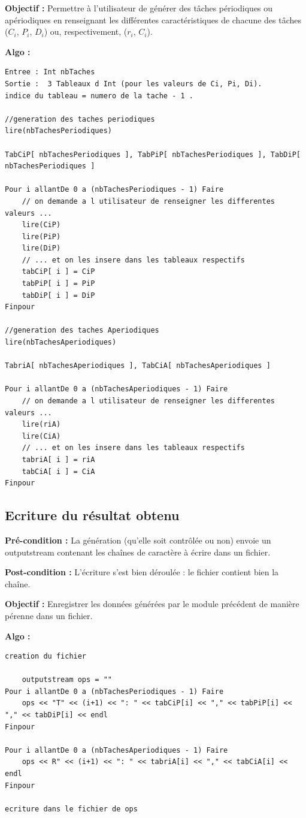 			\textbf{Objectif :} Permettre à l’utilisateur de générer des tâches périodiques ou apériodiques en renseignant les différentes caractéristiques de chacune des tâches ($C_i$, $P_i$, $D_i$) ou, respectivement, ($r_i$, $C_i$).
		
			\textbf{Algo :} 
			\begin{lstlisting}
Entree : Int nbTaches
Sortie :  3 Tableaux d Int (pour les valeurs de Ci, Pi, Di). 
indice du tableau = numero de la tache - 1 .

//generation des taches periodiques
lire(nbTachesPeriodiques)

TabCiP[ nbTachesPeriodiques ], TabPiP[ nbTachesPeriodiques ], TabDiP[ nbTachesPeriodiques ]
		
Pour i allantDe 0 a (nbTachesPeriodiques - 1) Faire
	// on demande a l utilisateur de renseigner les differentes valeurs ...
	lire(CiP)
	lire(PiP)
	lire(DiP)        
	// ... et on les insere dans les tableaux respectifs
	tabCiP[ i ] = CiP
	tabPiP[ i ] = PiP
	tabDiP[ i ] = DiP
Finpour

//generation des taches Aperiodiques
lire(nbTachesAperiodiques)

TabriA[ nbTachesAperiodiques ], TabCiA[ nbTachesAperiodiques ]
		
Pour i allantDe 0 a (nbTachesAperiodiques - 1) Faire
	// on demande a l utilisateur de renseigner les differentes valeurs ...
	lire(riA)
	lire(CiA)        
	// ... et on les insere dans les tableaux respectifs
	tabriA[ i ] = riA
	tabCiA[ i ] = CiA
Finpour

			\end{lstlisting}

		\subsection{Ecriture du résultat obtenu}
			\textbf{Pré-condition :} La génération (qu'elle soit contrôlée ou non) envoie un outputstream contenant les chaînes de caractère à écrire dans un fichier.
		
			\textbf{Post-condition :} L'écriture s'est bien déroulée : le fichier contient bien la chaîne.
		
			\textbf{Objectif :} Enregistrer les données générées par le module précédent de manière pérenne dans un fichier.
		
			\textbf{Algo :}
			\begin{lstlisting}
creation du fichier

	outputstream ops = ""
Pour i allantDe 0 a (nbTachesPeriodiques - 1) Faire
	ops << "T" << (i+1) << ": " << tabCiP[i] << "," << tabPiP[i] << "," << tabDiP[i] << endl
Finpour

Pour i allantDe 0 a (nbTachesAperiodiques - 1) Faire
	ops << R" << (i+1) << ": " << tabriA[i] << "," << tabCiA[i] << endl
Finpour

ecriture dans le fichier de ops
  
		\end{lstlisting}
	
